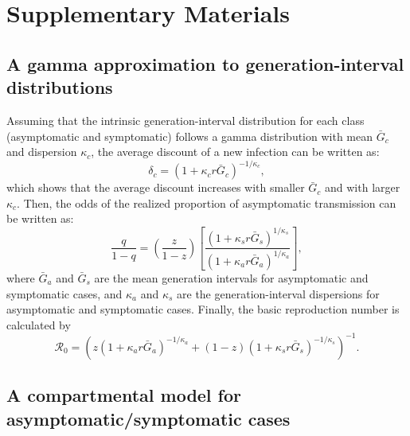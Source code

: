 \section*{Supplementary Materials}
\renewcommand\thefigure{S\arabic{figure}}
\renewcommand\theequation{S\arabic{equation}}
\setcounter{figure}{0}
\setcounter{equation}{0}

\subsection*{A gamma approximation to generation-interval distributions}

Assuming that the intrinsic generation-interval distribution for each class (asymptomatic and symptomatic) follows a gamma distribution with mean $\bar G_c$ and dispersion $\kappa_c$, the average discount of a new infection can be written as:
\begin{equation}
\delta_c = (1 + \kappa_c r \bar G_c)^{-1/\kappa_c},
\end{equation}
which shows that the average discount increases with smaller $\bar G_c$ and with larger $\kappa_c$.
Then, the odds of the realized proportion of asymptomatic transmission can be written as:
\begin{equation}
\frac{q}{1-q}=\left(\frac{z}{1-z}\right)\left[\frac{(1 + \kappa_s r \bar G_s)^{1/\kappa_s}}{(1 + \kappa_a r \bar G_a)^{1/\kappa_a}}\right],
\end{equation}
where $\bar G_a$ and $\bar G_s$ are the mean generation intervals for asymptomatic and symptomatic cases, and $\kappa_a$ and $\kappa_s$ are the generation-interval dispersions for asymptomatic and symptomatic cases.
Finally, the basic reproduction number is calculated by
\begin{equation}
\mathcal R_0 = \left(z (1 + \kappa_a r \bar G_a)^{-1/\kappa_a} + (1-z) (1 + \kappa_s r \bar G_s)^{-1/\kappa_s}\right)^{-1}.
\end{equation}

\subsection*{A compartmental model for asymptomatic/symptomatic cases}

